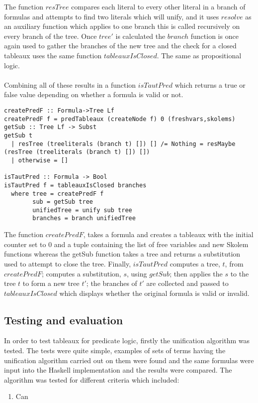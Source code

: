 \documentclass{article}%
\begin{document}
The function $resTree$ compares each literal to every other literal in a branch of formulas and attempts to find two literals which will unify, and it uses $resolve$ as an auxiliary function which applies to one branch this is called recursively on every branch of the tree.
Once $tree'$ is calculated the $branch$ function is once again used to gather the branches of the new tree and the check for a closed tableaux uses the same function $tableauxIsClosed$. The same as propositional logic.\\\\
Combining all of these results in a function $isTautPred$ which returns a true or false value depending on whether a formula is valid or not.

\begin{verbatim}
createPredF :: Formula->Tree Lf
createPredF f = predTableaux (createNode f) 0 (freshvars,skolems)
getSub :: Tree Lf -> Subst
getSub t 
  | resTree (treeliterals (branch t) []) [] /= Nothing = resMaybe (resTree (treeliterals (branch t) []) [])
  | otherwise = []

isTautPred :: Formula -> Bool
isTautPred f = tableauxIsClosed branches
  where tree = createPredF f
        sub = getSub tree
        unifiedTree = unify sub tree
        branches = branch unifiedTree
\end{verbatim}
The function $createPredF$, takes a formula and creates a tableaux with the initial counter set to 0 and a tuple containing the list of free variables and new Skolem functions whereas the getSub function takes a tree and returns a substitution used to attempt to close the tree. Finally, $isTautPred$ computes a tree, $t$, from $createPredF$; computes a substitution, $s$, using $getSub$; then applies the $s$ to the tree $t$ to form a new tree $t'$; the branches of $t'$ are collected and passed to $tableauxIsClosed$ which displays whether the original formula is valid or invalid. 


\subsection{Testing and evaluation}
In order to test tableaux for predicate logic, firstly the unification algorithm was tested. The tests were quite simple, examples of sets of terms having the unification algorithm carried out on them were found \cite{struth_2019} and the same formulas were input into the Haskell implementation and the results were compared. The algorithm was tested for different criteria which included:
\begin{enumerate}
\item Can 
\end{enumerate}
\end{document}
